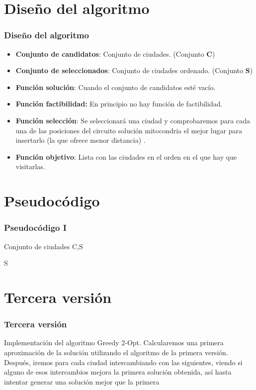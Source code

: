 \documentclass{beamer}
\begin{document}
\section{Diseño del algoritmo} 
\begin{frame}
	\frametitle{Diseño del algoritmo}
	\begin{itemize}
		\item \textbf{Conjunto de candidatos}: Conjunto de ciudades. (Conjunto \textbf{C})
		\item \textbf{Conjunto de seleccionados}: Conjunto de ciudades ordenado. (Conjunto \textbf{S})
		\item \textbf{Función solución}: Cuando el conjunto de candidatos esté vacío.
		\item \textbf{Función factibilidad:} En principio no hay función de factibilidad.
		\item \textbf{Función selección}: Se seleccionará una ciudad y comprobaremos para cada una de las posiciones del circuito solución mitocondria el mejor lugar para insertarlo (la que ofrece menor distancia) .
		\item \textbf{Función objetivo}: Lista con las ciudades en el orden en el que hay que visitarlas.		
	\end{itemize}
	
\end{frame}

\section{Pseudocódigo}
\begin{frame}
	\frametitle{Pseudocódigo I}
			\begin{algorithmic}				
						\Require Conjunto de ciudades C,S
							\EndFor
						\EndFor  
						
						\Return S	
						
				
					
			\end{algorithmic}

	
\end{frame}


\section{Tercera versión} 
\begin{frame}
	\frametitle{Tercera versión}
	Implementación del algoritmo Greedy 2-Opt. Calcularemos una primera aproximación de la solución utilizando el algoritmo de la primera versión. Después, iremos para cada ciudad intercambiando con las siguientes, viendo si alguno de esos intercambios mejora la primera solución obtenida, así hasta intentar generar una solución mejor que la primera
\end{frame}
\end{document}
